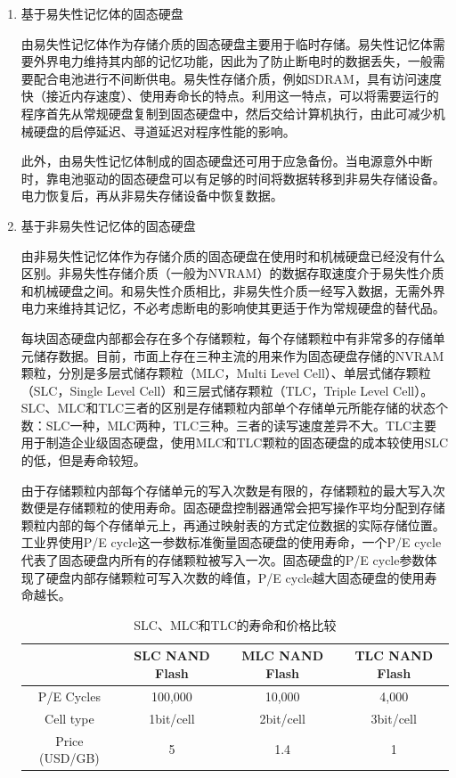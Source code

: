 \begin{enumerate}
\item 基于易失性记忆体的固态硬盘

由易失性记忆体作为存储介质的固态硬盘主要用于临时存储。易失性记忆体需要外界电力维持其内部的记忆功能，因此为了防止断电时的数据丢失，一般需要配合电池进行不间断供电。易失性存储介质，例如SDRAM，具有访问速度快（接近内存速度）、使用寿命长的特点。利用这一特点，可以将需要运行的程序首先从常规硬盘复制到固态硬盘中，然后交给计算机执行，由此可减少机械硬盘的启停延迟、寻道延迟对程序性能的影响。

此外，由易失性记忆体制成的固态硬盘还可用于应急备份。当电源意外中断时，靠电池驱动的固态硬盘可以有足够的时间将数据转移到非易失存储设备。电力恢复后，再从非易失存储设备中恢复数据。

\item 基于非易失性记忆体的固态硬盘

由非易失性记忆体作为存储介质的固态硬盘在使用时和机械硬盘已经没有什么区别。非易失性存储介质（一般为NVRAM）的数据存取速度介于易失性介质和机械硬盘之间。和易失性介质相比，非易失性介质一经写入数据，无需外界电力来维持其记忆，不必考虑断电的影响使其更适于作为常规硬盘的替代品。

每块固态硬盘内部都会存在多个存储颗粒，每个存储颗粒中有非常多的存储单元储存数据。目前，市面上存在三种主流的用来作为固态硬盘存储的NVRAM颗粒，分別是多层式储存颗粒（MLC，Multi Level Cell）、单层式储存颗粒（SLC，Single Level Cell）和三层式储存颗粒（TLC，Triple Level Cell）。SLC、MLC和TLC三者的区别是存储颗粒内部单个存储单元所能存储的状态个数：SLC一种，MLC两种，TLC三种。三者的读写速度差异不大。TLC主要用于制造企业级固态硬盘，使用MLC和TLC颗粒的固态硬盘的成本较使用SLC的低，但是寿命较短。

由于存储颗粒内部每个存储单元的写入次数是有限的，存储颗粒的最大写入次数便是存储颗粒的使用寿命。固态硬盘控制器通常会把写操作平均分配到存储颗粒内部的每个存储单元上，再通过映射表的方式定位数据的实际存储位置。工业界使用P/E cycle这一参数标准衡量固态硬盘的使用寿命，一个P/E cycle代表了固态硬盘内所有的存储颗粒被写入一次。固态硬盘的P/E cycle参数体现了硬盘内部存储颗粒可写入次数的峰值，P/E cycle越大固态硬盘的使用寿命越长。

\begin{table}[htb]
\centering
\caption{SLC、MLC和TLC的寿命和价格比较}
\begin{tabular}{|c|c|c|c|}
\hline  & SLC NAND Flash & MLC NAND Flash & TLC NAND Flash \\
\hline P/E Cycles & 100,000 & 10,000 & 4,000 \\
\hline Cell type & 1bit/cell & 2bit/cell & 3bit/cell \\
\hline Price (USD/GB) & 5 & 1.4 & 1 \\
\hline
\end{tabular}
\label{tab:slc-mlc-tlc-compare}
\end{table}


\end{enumerate}
